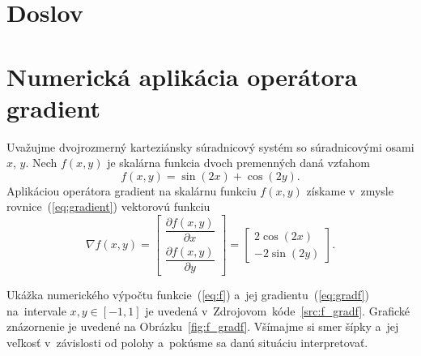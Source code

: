 \documentclass[a4paper,12pt]{book}
\begin{document}

\chapter*{Doslov}







\appendix
\chapter{Numerická aplikácia operátora gradient}
\label{app:numerical_application_of_gradient}

Uvažujme dvojrozmerný karteziánsky súradnicový systém so súradnicovými osami 
$x$, $y$.  Nech $f(x, y)$ je skalárna funkcia dvoch premenných daná vzťahom
%
\begin{equation}
\label{eq:f}
f(x, y) = \sin(2x) + \cos(2y){.}
\end{equation}
%
Aplikáciou operátora gradient na skalárnu funkciu $f(x, y)$ získame v~zmysle
rovnice~(\ref{eq:gradient}) vektorovú funkciu
%
\begin{equation}
\label{eq:gradf}
\nabla f(x, y) =
\begin{bmatrix}
\dfrac{\partial f(x, y)}{\partial x} \\[2ex]
\dfrac{\partial f(x, y)}{\partial y}
\end{bmatrix}
=
\begin{bmatrix}
2 \cos(2x) \\[2ex]
-2 \sin(2y)
\end{bmatrix}
{.}
\end{equation}

Ukážka numerického výpočtu funkcie~(\ref{eq:f}) a~jej 
gradientu~(\ref{eq:gradf}) na~intervale $x, y \in [-1, 1]$ je uvedená 
v~Zdrojovom~kóde~\ref{src:f_gradf}.  Grafické znázornenie je uvedené na 
Obrázku~\ref{fig:f_gradf}.  Všímajme si smer šípky a~jej veľkosť v~závislosti 
od polohy a~pokúsme sa danú situáciu interpretovať.


\end{document}
